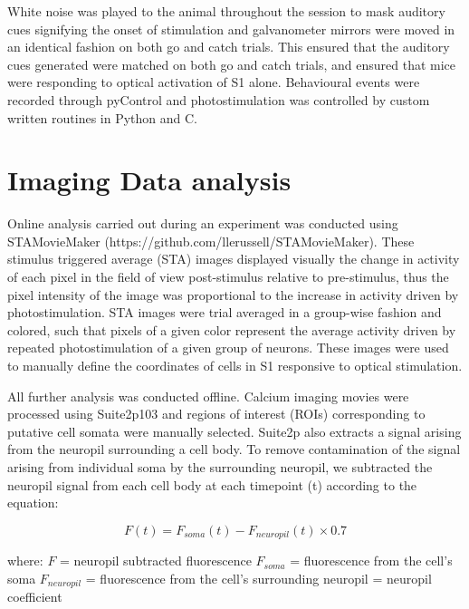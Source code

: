 White noise was played to the animal throughout the session to mask auditory cues signifying the onset of stimulation and galvanometer mirrors were moved in an identical fashion on both go and catch trials. This ensured that the auditory cues generated were matched on both go and catch trials, and ensured that mice were responding to optical activation of S1 alone. Behavioural events were recorded through pyControl and photostimulation was controlled by custom written routines in Python and C.


\section{Imaging Data analysis}

Online analysis carried out during an experiment was conducted using STAMovieMaker (https://github.com/llerussell/STAMovieMaker). These stimulus triggered average (STA) images displayed visually the change in activity of each pixel in the field of view post-stimulus relative to pre-stimulus, thus the pixel intensity of the image was proportional to the increase in activity driven by photostimulation. STA images were trial averaged in a group-wise fashion and colored, such that pixels of a given color represent the average activity driven by repeated photostimulation of a given group of neurons. These images were used to manually define the coordinates of cells in S1 responsive to optical stimulation.

All further analysis was conducted offline. Calcium imaging movies were processed using Suite2p103 and regions of interest (ROIs) corresponding to putative cell somata were manually selected. Suite2p also extracts a signal arising from the neuropil surrounding a cell body. To remove contamination of the signal arising from individual soma by the surrounding neuropil, we subtracted the neuropil signal from each cell body at each timepoint (t) according to the equation:

\begin{equation} \label{eq:neuropil_sub}
F(t) = F_{soma}(t) - F_{neuropil}(t) \times 0.7
\end{equation}

where: \newline
$F$ = neuropil subtracted fluorescence \newline
$F_{soma}$ = fluorescence from the cell's soma \newline
$F_{neuropil}$ = fluorescence from the cell's surrounding neuropil  = neuropil coefficient \cite{chen_ultrasensitive_2013} \newline

